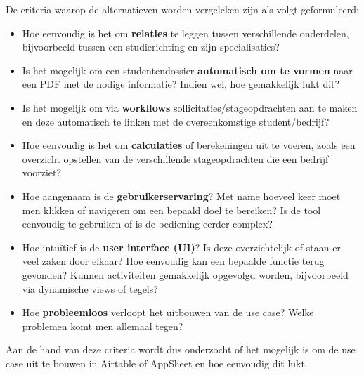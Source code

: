 De criteria waarop de alternatieven worden vergeleken zijn als volgt geformuleerd;

\begin{itemize}
    \item Hoe eenvoudig is het om \textbf{relaties} te leggen tussen verschillende onderdelen, bijvoorbeeld tussen een studierichting en zijn specialisaties?
    \item Is het mogelijk om een studentendossier \textbf{automatisch om te vormen} naar een PDF met de nodige informatie? Indien wel, hoe gemakkelijk lukt dit?
    \item Is het mogelijk om via \textbf{workflows} sollicitaties/stageopdrachten aan te maken en deze automatisch te linken met de overeenkomstige student/bedrijf?
    \item Hoe eenvoudig is het om \textbf{calculaties} of berekeningen uit te voeren, zoals een overzicht opstellen van de verschillende stageopdrachten die een bedrijf voorziet?
    \item Hoe aangenaam is de \textbf{gebruikerservaring}? Met name hoeveel keer moet men klikken of navigeren om een bepaald doel te bereiken? Is de tool eenvoudig te gebruiken of is de bediening eerder complex?
    \item Hoe intuïtief is de \textbf{user interface (UI)}? Is deze overzichtelijk of staan er veel zaken door elkaar? Hoe eenvoudig kan een bepaalde functie terug gevonden? Kunnen activiteiten gemakkelijk opgevolgd worden, bijvoorbeeld via dynamische views of tegels?
    \item Hoe \textbf{probleemloos} verloopt het uitbouwen van de use case? Welke problemen komt men allemaal tegen?
\end{itemize}

Aan de hand van deze criteria wordt dus onderzocht of het mogelijk is om de use case uit te bouwen in Airtable of AppSheet en hoe eenvoudig dit lukt.

